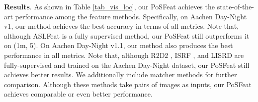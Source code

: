 \documentclass[10pt,twocolumn,letterpaper]{article}
\begin{document}
\noindent\textbf{Results}. As shown in Table \ref{tab_vis_loc}, our PoSFeat achieves the state-of-the-art performance among the feature methods. Specifically, on Aachen Day-Night v1, our method achieves the best accuracy in terms of all metrics. Note that, although ASLFeat is a fully supervised method, our PoSFeat still outperforms it on (1m, 5). On Aachen Day-Night v1.1, our method also produces the best performance in all metrics. Note that, although R2D2 \cite{revaud2019r2d2}, ISRF \cite{melekhov2020image}, and LISRD \cite{pautrat2020online} are fully-supervised and trained on the Aachen Day-Night dataset, our PoSFeat still achieves better results. We additionally include  matcher methods for further comparison. Although these methods take pairs of images as inputs, our PoSFeat achieves comparable or even better performance.
\end{document}
